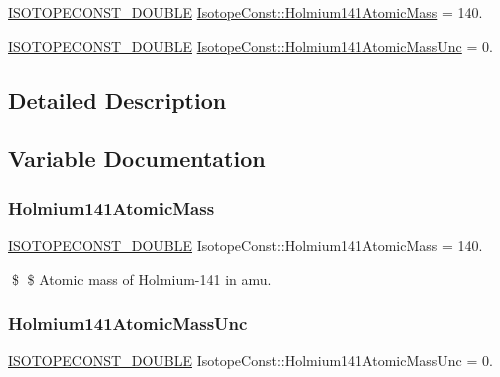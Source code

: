 \begin{DoxyCompactItemize}
\item 
\mbox{\hyperlink{group___isotope_const-_macros_ga8f45a7272ce02c0b4c65c44636ed719a}{I\+S\+O\+T\+O\+P\+E\+C\+O\+N\+S\+T\+\_\+\+D\+O\+U\+B\+LE}} \mbox{\hyperlink{group___isotope_const-_holmium-_ho141_ga0074d8504c22ca916ad966013663e69a}{Isotope\+Const\+::\+Holmium141\+Atomic\+Mass}} = 140.
\item 
\mbox{\hyperlink{group___isotope_const-_macros_ga8f45a7272ce02c0b4c65c44636ed719a}{I\+S\+O\+T\+O\+P\+E\+C\+O\+N\+S\+T\+\_\+\+D\+O\+U\+B\+LE}} \mbox{\hyperlink{group___isotope_const-_holmium-_ho141_ga73df13efae6a357503355be413581f2e}{Isotope\+Const\+::\+Holmium141\+Atomic\+Mass\+Unc}} = 0.
\end{DoxyCompactItemize}


\subsection{Detailed Description}


\subsection{Variable Documentation}
\mbox{\label{group___isotope_const-_holmium-_ho141_ga0074d8504c22ca916ad966013663e69a}} 
\subsubsection{\texorpdfstring{Holmium141\+Atomic\+Mass}{Holmium141AtomicMass}}
{\footnotesize\ttfamily \mbox{\hyperlink{group___isotope_const-_macros_ga8f45a7272ce02c0b4c65c44636ed719a}{I\+S\+O\+T\+O\+P\+E\+C\+O\+N\+S\+T\+\_\+\+D\+O\+U\+B\+LE}} Isotope\+Const\+::\+Holmium141\+Atomic\+Mass = 140.}

\$ \$ Atomic mass of Holmium-\/141 in amu. \mbox{\label{group___isotope_const-_holmium-_ho141_ga73df13efae6a357503355be413581f2e}} 
\subsubsection{\texorpdfstring{Holmium141\+Atomic\+Mass\+Unc}{Holmium141AtomicMassUnc}}
{\footnotesize\ttfamily \mbox{\hyperlink{group___isotope_const-_macros_ga8f45a7272ce02c0b4c65c44636ed719a}{I\+S\+O\+T\+O\+P\+E\+C\+O\+N\+S\+T\+\_\+\+D\+O\+U\+B\+LE}} Isotope\+Const\+::\+Holmium141\+Atomic\+Mass\+Unc = 0.}

